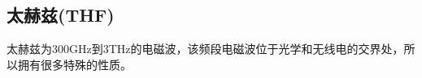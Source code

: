 \documentclass[UTF8]{article}
\begin{document}
\begin{CJK}{UTF8}{gkai}
\section{太赫兹(THF)}
太赫兹为300GHz到3THz的电磁波，该频段电磁波位于光学和无线电的交界处，所以拥有很多特殊的性质。
\end{CJK}
\end{document}
